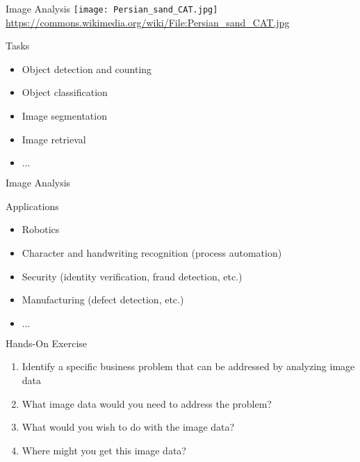 \documentclass[ignorenonframetext,xcolor=x11names]{beamer}
\begin{document}
\begin{frame}{Image Analysis}
\centering
\texttt{[image: Persian\_sand\_CAT.jpg]} \\

\scriptsize \url{https://commons.wikimedia.org/wiki/File:Persian_sand_CAT.jpg} \normalsize

\begin{block}{Tasks}
\begin{itemize}
	\item Object detection and counting
	\item Object classification
	\item Image segmentation
	\item Image retrieval
	\item $\ldots$
\end{itemize}
\end{block}
\end{frame}

\begin{frame}{Image Analysis}
\begin{block}{Applications}
\begin{itemize}
	\item Robotics
	\item Character and handwriting recognition (process automation)
	\item Security (identity verification, fraud detection, etc.)
	\item Manufacturing (defect detection, etc.)
	\item $\ldots$
\end{itemize}
\end{block}

\begin{block}{Hands-On Exercise}
\begin{enumerate}
	\item Identify a specific business problem that can be addressed by analyzing image data
	\item What image data would you need to address the problem?
	\item What would you wish to do with the image data?
	\item Where might you get this image data?
\end{enumerate}
\end{block}
\end{frame}
	
\end{document}
